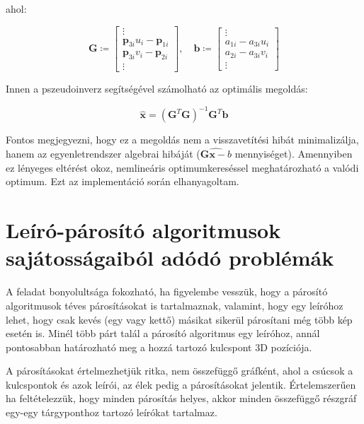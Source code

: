 	ahol:
	
	\begin{equation}
	\mathbf{G} \coloneqq \left[
	 \begin{array}{c}
	 	\vdots \\ 
	 	\mathbf{p}_{3i}u_i - \mathbf{p}_{1i} \\ 
	 	\mathbf{p}_{3i}v_i - \mathbf{p}_{2i} \\
	 	\vdots
	\end{array}	 \right], 
	\quad \mathbf{b} \coloneqq \left[ 
	\begin{array}{c}
		\vdots \\
		a_{1i} - a_{3i} u_i \\ 
		a_{2i} - a_{3i} v_i \\
		\vdots
\end{array}	 \right]
	\end{equation}
	
	Innen a pszeudoinverz segítségével számolható az optimális megoldás:
	
	\begin{equation}
	\hat{\mathbf{x}} = \left(\mathbf{G}^T\mathbf{G}\right)^{-1}\mathbf{G}^T\mathbf{b}
	\end{equation}
	
	Fontos megjegyezni, hogy ez a megoldás nem a visszavetítési hibát minimalizálja, hanem az egyenletrendszer algebrai hibáját ($\hat{\mathbf{Gx}-b}$ mennyiséget). Amennyiben ez lényeges eltérést okoz, nemlineáris optimumkereséssel meghatározható a valódi optimum. Ezt az implementáció során elhanyagoltam.

	\section{Leíró-párosító algoritmusok sajátosságaiból adódó problémák}
	A feladat bonyolultsága fokozható, ha figyelembe vesszük, hogy a párosító algoritmusok téves párosításokat is tartalmaznak, valamint, hogy egy leíróhoz lehet, hogy csak kevés (egy vagy kettő) másikat sikerül párosítani még több kép esetén is. Minél több párt talál a párosító algoritmus egy leíróhoz, annál pontosabban határozható meg a hozzá tartozó kulcspont 3D pozíciója.
	
	A párosításokat értelmezhetjük ritka, nem összefüggő gráfként, ahol a csúcsok a kulcspontok és azok leírói, az élek pedig a párosításokat jelentik. Értelemszerűen ha feltételezzük, hogy minden párosítás helyes, akkor minden összefüggő részgráf egy-egy tárgyponthoz tartozó leírókat tartalmaz. 
	
